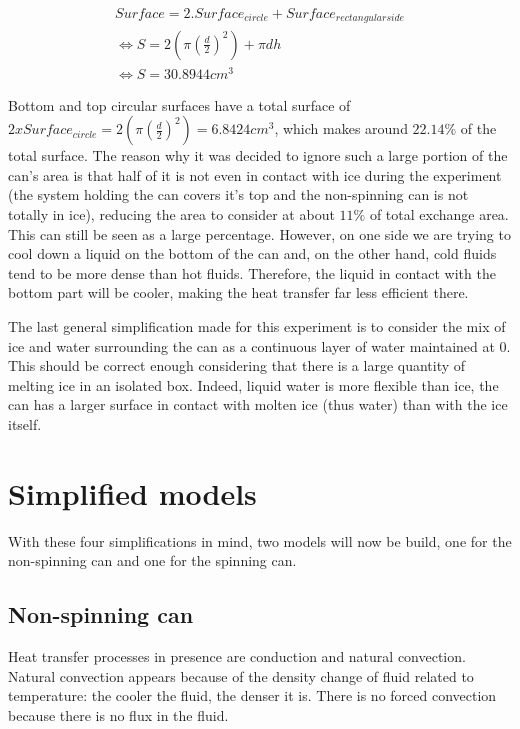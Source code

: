 \documentclass{report}
\begin{document}
	\begin{equation}
		\begin{gathered}
			Surface= 2.Surface_{circle} + Surface_{rectangular side} \\
			\Leftrightarrow S= 2 (\pi  (\frac{d}{2})^2) + \pi dh \\
			\Leftrightarrow S= 30.8944 cm^3
		\end{gathered}
	\end{equation}
	
	Bottom and top circular surfaces have a total surface of $2xSurface_{circle}=2 (\pi  (\frac{d}{2})^2)= 6.8424 cm^3$, which makes around $22.14\% $ of the total surface. The reason why it was decided to ignore such a large portion of the can's area is that half of it is not even in contact with ice during the experiment (the system holding the can covers it's top and the non-spinning can is not totally in ice), reducing the area to consider at about $11\% $ of total exchange area. This can still be seen as a large percentage. However, on one side we are trying to cool down a liquid on the bottom of the can and, on the other hand, cold fluids tend to be more dense than hot fluids. Therefore, the liquid in contact with the bottom part will be cooler, making the heat transfer far less efficient there.
	
	The last general simplification made for this experiment is to consider the mix of ice and water surrounding the can as a continuous layer of water maintained at 0\textcelsius. This should be correct enough considering that there is a large quantity of melting ice in an isolated box. Indeed, liquid water is more flexible than ice, the can has a larger surface in contact with molten ice (thus water) than with the ice itself.
	
	
	\section{Simplified models}\label{sm}
	
	With these four simplifications in mind, two models will now be build, one for the non-spinning can and one for the spinning can.
	
	\subsection{Non-spinning can}\label{nsc}
	
	Heat transfer processes in presence are conduction and natural convection. Natural convection appears because of the density change of fluid related to temperature: the cooler the fluid, the denser it is. There is no forced convection because there is no flux in the fluid.
	
\end{document}
